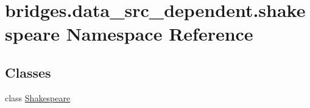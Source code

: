 \hypertarget{namespacebridges_1_1data__src__dependent_1_1shakespeare}{}\section{bridges.\+data\+\_\+src\+\_\+dependent.\+shakespeare Namespace Reference}
\label{namespacebridges_1_1data__src__dependent_1_1shakespeare}
\subsection*{Classes}
\begin{DoxyCompactItemize}
\item 
class \mbox{\hyperlink{classbridges_1_1data__src__dependent_1_1shakespeare_1_1_shakespeare}{Shakespeare}}
\end{DoxyCompactItemize}

